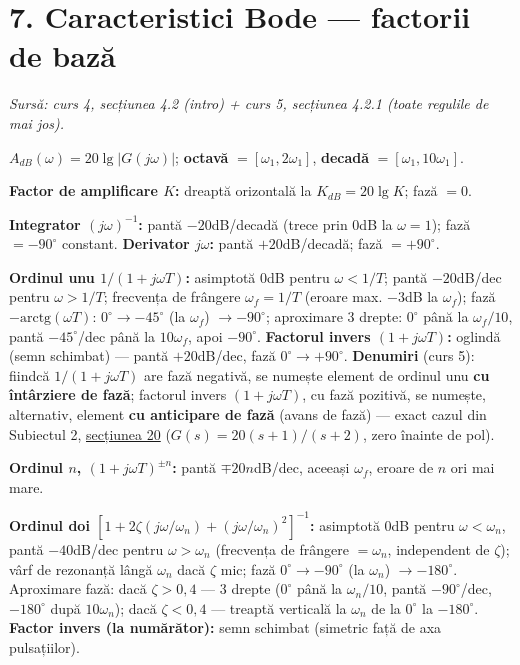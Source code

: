 \documentclass[10pt,a4paper]{article}
\newcommand{\srcnote}[1]{{\footnotesize\color{gray!55!black}\textit{Sursă: #1}}\par}
\begin{document}
\section*{7. Caracteristici Bode — factorii de bază}\label{sec:7}
\srcnote{curs 4, secțiunea 4.2 (intro) + curs 5, secțiunea 4.2.1 (toate regulile de mai jos).}
$A_{dB}(\omega)=20\lg|G(j\omega)|$; \textbf{octavă} $=[\omega_1,2\omega_1]$, \textbf{decadă} $=[\omega_1,10\omega_1]$.
\begin{keyeq}\color{red!65!black}
\textbf{Factor de amplificare $K$:} dreaptă orizontală la $K_{dB}=20\lg K$; fază $=0$.

\textbf{Integrator $(j\omega)^{-1}$:} pantă $-20$dB/decadă (trece prin $0$dB la $\omega{=}1$); fază $=-90^\circ$ constant. \textbf{Derivator $j\omega$:} pantă $+20$dB/decadă; fază $=+90^\circ$.

\textbf{Ordinul unu $1/(1+j\omega T)$:} asimptotă $0$dB pentru $\omega<1/T$; pantă $-20$dB/dec pentru $\omega>1/T$; frecvența de frângere $\omega_f=1/T$ (eroare max. $-3$dB la $\omega_f$); fază $-\mathrm{arctg}(\omega T)$: $0^\circ\to-45^\circ$ (la $\omega_f$) $\to-90^\circ$; aproximare 3 drepte: $0^\circ$ până la $\omega_f/10$, pantă $-45^\circ$/dec până la $10\omega_f$, apoi $-90^\circ$. \textbf{Factorul invers $(1+j\omega T)$:} oglindă (semn schimbat) — pantă $+20$dB/dec, fază $0^\circ\to+90^\circ$. \textbf{Denumiri} (curs 5): fiindcă $1/(1{+}j\omega T)$ are fază negativă, se numește element de ordinul unu \textbf{cu întârziere de fază}; factorul invers $(1{+}j\omega T)$, cu fază pozitivă, se numește, alternativ, element \textbf{cu anticipare de fază} (avans de fază) — exact cazul din Subiectul 2, \hyperref[sec:20]{secțiunea 20} ($G(s){=}20(s{+}1)/(s{+}2)$, zero înainte de pol).

\textbf{Ordinul $n$, $(1+j\omega T)^{\pm n}$:} pantă $\mp20n$dB/dec, aceeași $\omega_f$, eroare de $n$ ori mai mare.

\textbf{Ordinul doi $[1+2\zeta(j\omega/\omega_n)+(j\omega/\omega_n)^2]^{-1}$:} asimptotă $0$dB pentru $\omega<\omega_n$, pantă $-40$dB/dec pentru $\omega>\omega_n$ (frecvența de frângere $=\omega_n$, independent de $\zeta$); vârf de rezonanță lângă $\omega_n$ dacă $\zeta$ mic; fază $0^\circ\to-90^\circ$ (la $\omega_n$) $\to-180^\circ$. Aproximare fază: dacă $\zeta>0{,}4$ — 3 drepte ($0^\circ$ până la $\omega_n/10$, pantă $-90^\circ$/dec, $-180^\circ$ după $10\omega_n$); dacă $\zeta<0{,}4$ — treaptă verticală la $\omega_n$ de la $0^\circ$ la $-180^\circ$. \textbf{Factor invers (la numărător):} semn schimbat (simetric față de axa pulsațiilor).
\end{keyeq}
\end{document}
